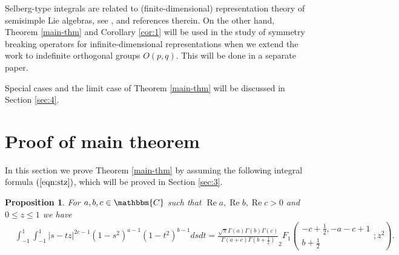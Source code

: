 \documentclass{svjour3}
\newcommand{\tmop}[1]{\ensuremath{\operatorname{#1}}}
\newtheorem{proposition}{Proposition}
{\theorembodyfont{\rmfamily}\newtheorem{remark}{Remark}}
\begin{document}
Selberg-type integrals are related to (finite-dimensional) representation
theory of semisimple Lie algebras, see {\cite{forrester2008importance}},
{\cite{tarasov2003selberg}} and references therein. On the other hand, Theorem
\ref{main-thm} and Corollary \ref{cor:1} will be used in the study of symmetry
breaking operators for infinite-dimensional representations when we extend the
work {\cite{kobayashi2015symmetry}} to indefinite orthogonal groups $O (p,
q)$. This will be done in a separate paper.

Special cases and the limit case of Theorem \ref{main-thm} will be discussed
in Section \ref{sec:4}.

\section{Proof of main theorem}\label{sec:2}

In this section we prove Theorem \ref{main-thm} by assuming the following
integral formula $(\ref{eqn:stz})$, which will be proved in Section
\ref{sec:3}.

\begin{proposition}
  \label{prop:2}For $a, b, c \in \mathbbm{C}$ such that $\tmop{Re} a,
  \tmop{Re} b, \tmop{Re} c > 0$ and $0 \leqslant z \leqslant 1$ we have
  \begin{eqnarray}
    & \int_{- 1}^1 \int_{- 1}^1 | s - t z |^{2 c - 1} (1 - s^2)^{a - 1} (1 -
    t^2)^{b - 1} d s d t = \frac{\sqrt{\pi} \Gamma (a) \Gamma (b) \Gamma
    (c)}{\Gamma (a + c) \Gamma \left( b + \frac{1}{2} \right)} _2 F_1 \left(
    \begin{array}{c}
      - c + \frac{1}{2}, - a - c + 1\\
      b + \frac{1}{2}
    \end{array} ; z^2 \right) .  \label{eqn:stz} & \\
    &  &  \nonumber
  \end{eqnarray}
\end{proposition}
\end{document}
